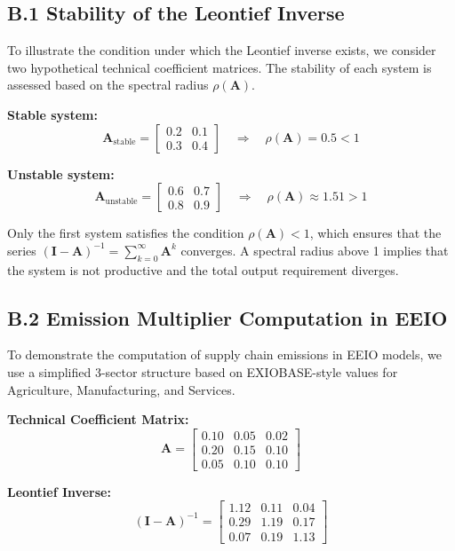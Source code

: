 \documentclass[12pt,a4paper]{article}%
\begin{document}
\subsection*{B.1 Stability of the Leontief Inverse}

To illustrate the condition under which the Leontief inverse exists, we consider two hypothetical technical coefficient matrices. The stability of each system is assessed based on the spectral radius \( \rho(\mathbf{A}) \).

\textbf{Stable system:}
\[
\mathbf{A}_{\text{stable}} =
\begin{bmatrix}
0.2 & 0.1 \\
0.3 & 0.4
\end{bmatrix}
\quad \Rightarrow \quad \rho(\mathbf{A}) = 0.5 < 1
\]

\textbf{Unstable system:}
\[
\mathbf{A}_{\text{unstable}} =
\begin{bmatrix}
0.6 & 0.7 \\
0.8 & 0.9
\end{bmatrix}
\quad \Rightarrow \quad \rho(\mathbf{A}) \approx 1.51 > 1
\]

Only the first system satisfies the condition \( \rho(\mathbf{A}) < 1 \), which ensures that the series \( (\mathbf{I} - \mathbf{A})^{-1} = \sum_{k=0}^\infty \mathbf{A}^k \) converges. A spectral radius above 1 implies that the system is not productive and the total output requirement diverges.

\subsection*{B.2 Emission Multiplier Computation in EEIO}

To demonstrate the computation of supply chain emissions in EEIO models, we use a simplified 3-sector structure based on EXIOBASE-style values for Agriculture, Manufacturing, and Services.

\textbf{Technical Coefficient Matrix:}
\[
\mathbf{A} =
\begin{bmatrix}
0.10 & 0.05 & 0.02 \\
0.20 & 0.15 & 0.10 \\
0.05 & 0.10 & 0.10
\end{bmatrix}
\]

\textbf{Leontief Inverse:}
\[
(\mathbf{I} - \mathbf{A})^{-1} =
\begin{bmatrix}
1.12 & 0.11 & 0.04 \\
0.29 & 1.19 & 0.17 \\
0.07 & 0.19 & 1.13
\end{bmatrix}
\]
\end{document}
